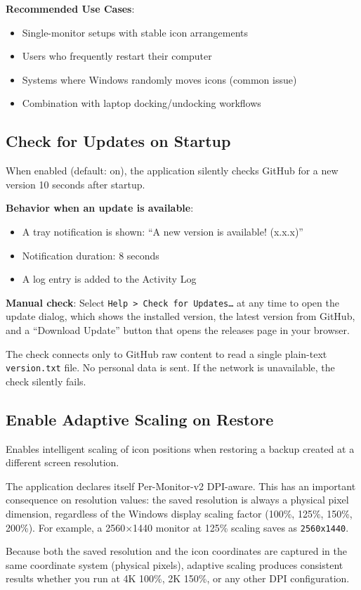 \documentclass[a4paper,11pt]{article}
\begin{document}
\textbf{Recommended Use Cases}:
\begin{itemize}
  \item Single-monitor setups with stable icon arrangements
  \item Users who frequently restart their computer
  \item Systems where Windows randomly moves icons (common issue)
  \item Combination with laptop docking/undocking workflows
\end{itemize}

\subsection{Check for Updates on Startup}

When enabled (default: on), the application silently checks GitHub
for a new version 10 seconds after startup.

\textbf{Behavior when an update is available}:
\begin{itemize}
  \item A tray notification is shown: ``A new version is available! (x.x.x)''
  \item Notification duration: 8 seconds
  \item A log entry is added to the Activity Log
\end{itemize}

\textbf{Manual check}: Select \texttt{Help > Check for Updates\ldots}
at any time to open the update dialog, which shows the installed
version, the latest version from GitHub, and a ``Download Update''
button that opens the releases page in your browser.

\begin{infobox}
  The check connects only to GitHub raw content to read a single
  plain-text \texttt{version.txt} file. No personal data is sent.
  If the network is unavailable, the check silently fails.
\end{infobox}

\subsection{Enable Adaptive Scaling on Restore}

Enables intelligent scaling of icon positions when restoring a backup
created at a different screen resolution.

\begin{infobox}
  The application declares itself Per-Monitor-v2 DPI-aware.
  This has an important consequence on resolution values: the saved
  resolution is always a physical pixel dimension, regardless of
  the Windows display scaling factor (100\%, 125\%, 150\%, 200\%).
  For example, a 2560$\times$1440 monitor at 125\% scaling saves
  as \texttt{2560x1440}.

  Because both the saved resolution and the icon coordinates are
  captured in the same coordinate system (physical pixels), adaptive
  scaling produces consistent results whether you run at 4K 100\%,
  2K 150\%, or any other DPI configuration.
\end{infobox}
\end{document}
